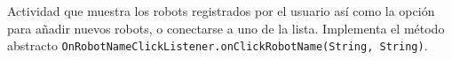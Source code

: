 Actividad que muestra los robots registrados por el usuario así como la opción para añadir nuevos robots, o conectarse a uno de la lista. Implementa el método abstracto \texttt{OnRobotNameClickListener.onClickRobotName(String, String)}.

%
%
%
%
%
%
%
%
%




